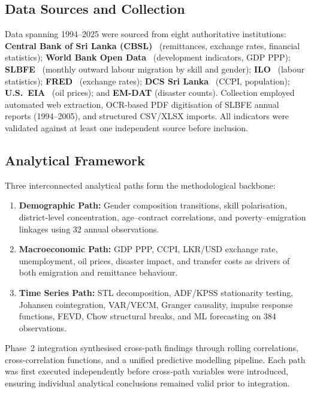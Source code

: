 \documentclass[sigconf]{acmart}
\begin{document}
\subsection{Data Sources and Collection}
Data spanning 1994--2025 were sourced from eight authoritative institutions: \textbf{Central Bank of Sri Lanka (CBSL)}~\cite{cbsl} (remittances, exchange rates, financial statistics); \textbf{World Bank Open Data}~\cite{worldbank-remittances,worldbank-migration,worldbank-ppp} (development indicators, GDP PPP); \textbf{SLBFE}~\cite{slbfe} (monthly outward labour migration by skill and gender); \textbf{ILO}~\cite{ilo} (labour statistics); \textbf{FRED}~\cite{fred-remittances,cbsl-exchangerate} (exchange rates); \textbf{DCS Sri Lanka}~\cite{ccpi} (CCPI, population); \textbf{U.S.~EIA}~\cite{eia-oil} (oil prices); and \textbf{EM-DAT}\cite{emdat2026} (disaster counts). Collection employed automated web extraction, OCR-based PDF digitisation of SLBFE annual reports (1994--2005), and structured CSV/XLSX imports. All indicators were validated against at least one independent source before inclusion.

\subsection{Analytical Framework}
Three interconnected analytical paths form the methodological backbone:
\begin{enumerate}[noitemsep,topsep=0pt]
\item \textbf{Demographic Path:} Gender composition transitions, skill polarisation, district-level concentration, age--contract correlations, and poverty--emigration linkages using 32 annual observations.
\item \textbf{Macroeconomic Path:} GDP PPP, CCPI, LKR/USD exchange rate, unemployment, oil prices, disaster impact, and transfer costs as drivers of both emigration and remittance behaviour.
\item \textbf{Time Series Path:} STL decomposition, ADF/KPSS stationarity testing, Johansen cointegration, VAR/VECM, Granger causality, impulse response functions, FEVD, Chow structural breaks, and ML forecasting on 384 observations.
\end{enumerate}
Phase~2 integration synthesised cross-path findings through rolling correlations, cross-correlation functions, and a unified predictive modelling pipeline. Each path was first executed independently before cross-path variables were introduced, ensuring individual analytical conclusions remained valid prior to integration.
\end{document}
